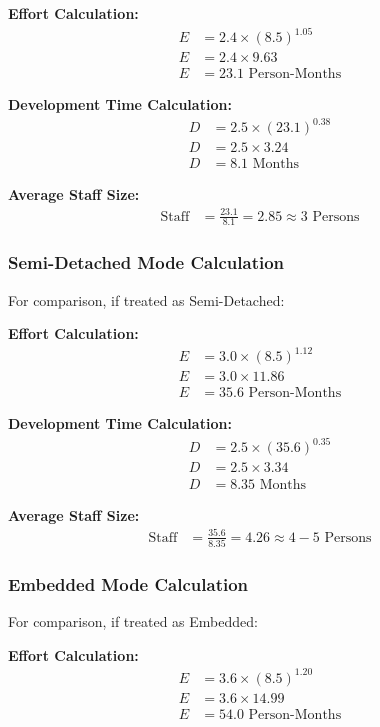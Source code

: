 \documentclass[12pt,a4paper]{article}
\begin{document}
\textbf{Effort Calculation:}
\begin{align}
E &= 2.4 \times (8.5)^{1.05} \\
E &= 2.4 \times 9.63 \\
E &= \boxed{23.1 \text{ Person-Months}}
\end{align}

\textbf{Development Time Calculation:}
\begin{align}
D &= 2.5 \times (23.1)^{0.38} \\
D &= 2.5 \times 3.24 \\
D &= \boxed{8.1 \text{ Months}}
\end{align}

\textbf{Average Staff Size:}
\begin{align}
\text{Staff} &= \frac{23.1}{8.1} = \boxed{2.85 \approx 3 \text{ Persons}}
\end{align}

\subsubsection{Semi-Detached Mode Calculation}

For comparison, if treated as Semi-Detached:

\textbf{Effort Calculation:}
\begin{align}
E &= 3.0 \times (8.5)^{1.12} \\
E &= 3.0 \times 11.86 \\
E &= \boxed{35.6 \text{ Person-Months}}
\end{align}

\textbf{Development Time Calculation:}
\begin{align}
D &= 2.5 \times (35.6)^{0.35} \\
D &= 2.5 \times 3.34 \\
D &= \boxed{8.35 \text{ Months}}
\end{align}

\textbf{Average Staff Size:}
\begin{align}
\text{Staff} &= \frac{35.6}{8.35} = \boxed{4.26 \approx 4-5 \text{ Persons}}
\end{align}

\subsubsection{Embedded Mode Calculation}

For comparison, if treated as Embedded:

\textbf{Effort Calculation:}
\begin{align}
E &= 3.6 \times (8.5)^{1.20} \\
E &= 3.6 \times 14.99 \\
E &= \boxed{54.0 \text{ Person-Months}}
\end{align}
\end{document}
